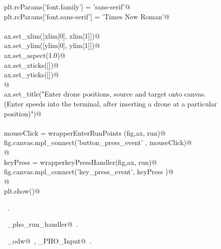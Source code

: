 \documentclass[12.0pt]{report}
\begin{document}
\begin{flushleft}
\begin{list}{}{}
\mbox{}\verb@    plt.rcParams['font.family'] = 'sans-serif'@\\
\mbox{}\verb@    plt.rcParams['font.sans-serif'] = 'Times New Roman'@\\
\mbox{}\verb@@\\
\mbox{}\verb@    ax.set_xlim([xlim[0], xlim[1]])@\\
\mbox{}\verb@    ax.set_ylim([ylim[0], ylim[1]])@\\
\mbox{}\verb@    ax.set_aspect(1.0)@\\
\mbox{}\verb@    ax.set_xticks([])@\\
\mbox{}\verb@    ax.set_yticks([])@\\
\mbox{}\verb@          @\\
\mbox{}\verb@    ax.set_title("Enter drone positions, source and target onto canvas. \n \@\\
\mbox{}\verb@(Enter speeds into the terminal, after inserting a drone at a particular position)")@\\
\mbox{}\verb@@\\
\mbox{}\verb@    mouseClick   = wrapperEnterRunPoints (fig,ax, run)@\\
\mbox{}\verb@    fig.canvas.mpl_connect('button_press_event' , mouseClick)@\\
\mbox{}\verb@          @\\
\mbox{}\verb@    keyPress     = wrapperkeyPressHandler(fig,ax, run)@\\
\mbox{}\verb@    fig.canvas.mpl_connect('key_press_event', keyPress   )@\\
\mbox{}\verb@    @\\
\mbox{}\verb@    plt.show()@\\
\mbox{}\verb@@{\NWsep}
\end{list}
\vspace{-1.5ex}
\footnotesize
\begin{list}{}{\setlength{\itemsep}{-\parsep}\setlength{\itemindent}{-\leftmargin}}
\item \NWtxtMacroRefIn\ .
\item \NWtxtIdentsDefed\nobreak\  \verb@single_pho_run_handler@\nobreak\ .\item \NWtxtIdentsUsed\nobreak\  \verb@algo_odw@\nobreak\ , \verb@Single_PHO_Input@\nobreak\ .
\item{}
\end{list}
\vspace{4ex}
\end{flushleft}
\end{document}

